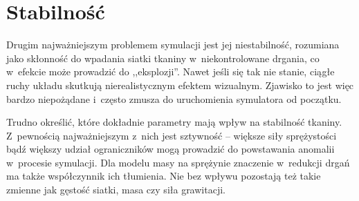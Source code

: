 		
		
		
		
		
		
		
		
		
		
	
	\section{Stabilność}
	\label{t:wyniki:stabilnosc}
	
		Drugim najważniejszym problemem symulacji jest jej niestabilność, rozumiana jako skłonność do wpadania siatki tkaniny w~niekontrolowane drgania, co w~efekcie może prowadzić do ,,eksplozji''. Nawet jeśli się tak nie stanie, ciągłe ruchy układu skutkują nierealistycznym efektem wizualnym. Zjawisko to jest więc bardzo niepożądane i~często zmusza do uruchomienia symulatora od początku.
		
		Trudno określić, które dokładnie parametry mają wpływ na stabilność tkaniny. Z~pewnością najważniejszym z~nich jest sztywność -- większe siły sprężystości bądź większy udział ograniczników mogą prowadzić do powstawania anomalii w~procesie symulacji. Dla modelu masy na sprężynie znaczenie w~redukcji drgań ma także współczynnik ich tłumienia. Nie bez wpływu pozostają też takie zmienne jak gęstość siatki, masa czy siła grawitacji.
		
